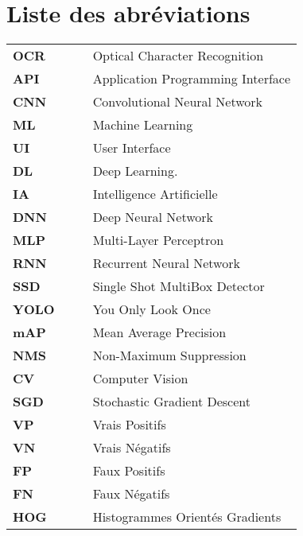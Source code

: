 \chapter*{Liste des abréviations}

\begin{tabular}{llll}

\textbf{OCR} & & & Optical Character Recognition\\
\textbf{API} & & & Application Programming Interface\\
\textbf{CNN} & & & Convolutional Neural Network\\
\textbf{ML} & & & Machine Learning\\
\textbf{UI} & & & User Interface\\
\textbf{DL} & & & Deep Learning.\\
\textbf{IA} & & & Intelligence Artificielle\\
\textbf{DNN} & & & Deep Neural Network\\
\textbf{MLP} & & & Multi-Layer Perceptron\\
\textbf{RNN} & & & Recurrent Neural Network\\
\textbf{SSD} & & & Single Shot MultiBox Detector\\
\textbf{YOLO} & & & You Only Look Once \\
\textbf{mAP} & & & Mean Average Precision \\
\textbf{NMS} & & & Non-Maximum Suppression  \\
\textbf{CV} & & & Computer Vision\\
\textbf{SGD} & & & Stochastic Gradient Descent\\
\textbf{VP} & & & Vrais Positifs\\
\textbf{VN} & & & Vrais Négatifs \\
\textbf{FP} & & & Faux Positifs\\
\textbf{FN} & & & Faux Négatifs \\
\textbf{HOG} & & & Histogrammes Orientés Gradients\\

\end{tabular}